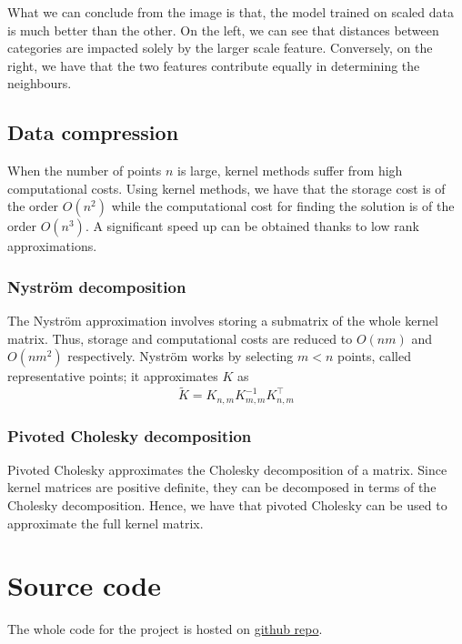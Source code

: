 What we can conclude from the image is that, the model trained on scaled data is much better than the other.
On the left, we can see that distances between categories are impacted solely by the larger scale feature. Conversely, on the right, we have that the two features contribute equally in determining the neighbours.

\subsection{Data compression}
When the number of points $n$ is large, kernel methods suffer from high computational costs. 
Using kernel methods, we have that the storage cost is of the order $O(n^2)$ while the computational cost for finding the solution is of the order $O(n^3)$.
A significant speed up can be obtained thanks to low rank approximations.


\subsubsection{Nyström decomposition}
The Nyström approximation involves storing a submatrix of the whole kernel matrix. Thus, storage and computational costs are reduced to $O(nm)$ and $O(nm^2)$ respectively.
Nyström works by selecting $m<n$ points, called representative points; it approximates $K$ as
\begin{equation}
    \tilde {K}=K_{n,m} K_{m,m}^{-1}K_{n,m}^\intercal
\end{equation}


\subsubsection{Pivoted Cholesky decomposition}
Pivoted Cholesky approximates the Cholesky decomposition of a matrix. Since kernel matrices are positive definite, they can be decomposed in terms of the Cholesky decomposition. Hence, we have that pivoted Cholesky can be used to approximate the full kernel matrix.


\newpage
\section{Source code}\label{src_code}
The whole code for the project is hosted on
\href{https://github.com/luca-pernigo/ThesisKernelMethods}{github repo}.

